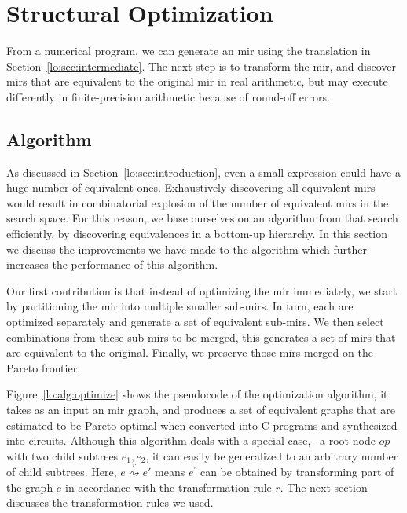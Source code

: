 \section{Structural Optimization}
\label{lo:sec:structural_optimization}

From a numerical program, we can generate an \gls{mir} using the translation
in Section~\ref{lo:sec:intermediate}.  The next step is to transform the
\gls{mir}, and discover \glspl{mir} that are equivalent to the original
\gls{mir} in real arithmetic, but may execute differently in finite-precision
arithmetic because of round-off errors.

\subsection{Algorithm}
\label{lo:sub:algorithm}


As discussed in Section~\ref{lo:sec:introduction}, even a small expression
could have a huge number of equivalent ones.  Exhaustively discovering
all equivalent \glspl{mir} would result in combinatorial explosion of the
number of equivalent \glspl{mir} in the search space.  For this reason, we
base ourselves on an algorithm from \soap{} that search efficiently, by
discovering equivalences in a bottom-up hierarchy.  In this section we discuss
the improvements we have made to the algorithm which further increases the
performance of this algorithm.

Our first contribution is that instead of optimizing the \gls{mir} immediately,
we start by partitioning the \gls{mir} into multiple smaller sub-\glspl{mir}.
In turn, each are optimized separately and generate a set of equivalent
sub-\glspl{mir}.  We then select combinations from these sub-\glspl{mir}
to be merged, this generates a set of \glspl{mir} that are equivalent to
the original.  Finally, we preserve those \glspl{mir} merged on the Pareto
frontier.

Figure~\ref{lo:alg:optimize} shows the pseudocode of the optimization
algorithm, it takes as an input an \gls{mir} graph, and produces a set of
equivalent graphs that are estimated to be Pareto-optimal when converted into
C programs and synthesized into circuits.  Although this algorithm deals with
a special case, \ie~a root node $op$ with two child subtrees $e_1, e_2$, it
can easily be generalized to an arbitrary number of child subtrees.  Here,
$e \stackrel{r}{\rightsquigarrow} e'$ means $e^\prime$ can be obtained by
transforming part of the graph $e$ in accordance with the transformation rule
$r$.  The next section discusses the transformation rules we used.


